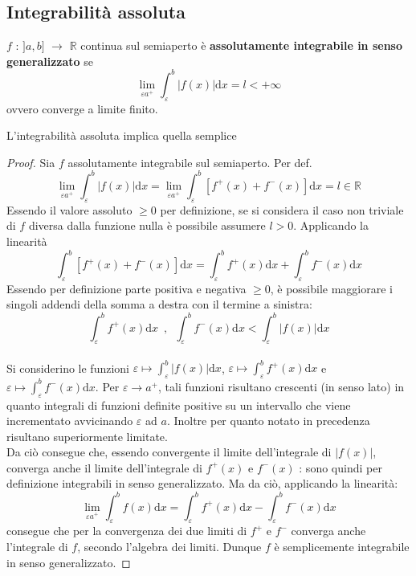 \documentclass[10pt, oneside]{book}
\theoremstyle{plain}
\begin{document}
\subsection{Integrabilità assoluta}
\begin{defin}
    $f$ : $]a,b]$ $\rightarrow$ $\mathbb{R}$ continua sul semiaperto è \textbf{assolutamente integrabile in senso generalizzato} se 
    \[\lim\limits_{\varepsilon a^+} \int_{\varepsilon}^{b} |f(x)|\textrm{d}x = l < + \infty\]
    ovvero converge a limite finito.
\end{defin}
\begin{prop}
    L'integrabilità assoluta implica quella semplice
\end{prop}
\begin{proof}
    Sia $f$ assolutamente integrabile sul semiaperto. Per def.
    \[\lim\limits_{\varepsilon a^+} \int_{\varepsilon}^{b} |f(x)|\textrm{d}x = \lim\limits_{\varepsilon a^+} \int_{\varepsilon}^{b} [f^+(x) + f^-(x)]\textrm{d}x = l \in \mathbb{R}\]
    Essendo il valore assoluto $\geq 0$ per definizione, se si considera il caso non triviale di $f$ diversa dalla funzione nulla è possibile assumere $l>0$. Applicando la linearità 
    \[\int_{\varepsilon}^{b} [f^+(x) + f^-(x)]\textrm{d}x = \int_{\varepsilon}^{b} f^+(x)\textrm{d}x + \int_{\varepsilon}^{b} f^-(x)\textrm{d}x\]
    Essendo per definizione parte positiva e negativa $\geq 0$, è possibile maggiorare i singoli addendi della somma a destra con il termine a sinistra:
    \[\int_{\varepsilon}^{b} f^+(x)\textrm{d}x \enspace, \enspace \int_{\varepsilon}^{b} f^-(x)\textrm{d}x < \int_{\varepsilon}^{b} |f(x)|\textrm{d}x\]
    \\Si considerino le funzioni $\varepsilon \mapsto \int_{\varepsilon}^{b} |f(x)|\textrm{d}x$, $\varepsilon \mapsto \int_{\varepsilon}^{b} f^+(x)\textrm{d}x$ e $\varepsilon \mapsto \int_{\varepsilon}^{b} f^-(x)\textrm{d}x$. Per $\varepsilon \rightarrow a^+$, tali funzioni risultano crescenti (in senso lato) in quanto integrali di funzioni definite positive su un intervallo che viene incrementato avvicinando $\varepsilon$ ad $a$. Inoltre per quanto notato in precedenza risultano superiormente limitate.
    \\Da ciò consegue che, essendo convergente il limite dell'integrale di $|f(x)|$, converga anche il limite dell'integrale di $f^+(x)$ e $f^-(x)$ : sono quindi per definizione integrabili in senso generalizzato. Ma da ciò, applicando la linearità:
    \[\lim\limits_{\varepsilon a^+} \int_{\varepsilon}^{b} f(x)\textrm{d}x = \int_{\varepsilon}^{b} f^+(x)\textrm{d}x - \int_{\varepsilon}^{b} f^-(x)\textrm{d}x\]
    consegue che per la convergenza dei due limiti di $f^+$ e $f^-$ converga anche l'integrale di $f$, secondo l'algebra dei limiti. Dunque $f$ è semplicemente integrabile in senso generalizzato.
\end{proof}
\end{document}
